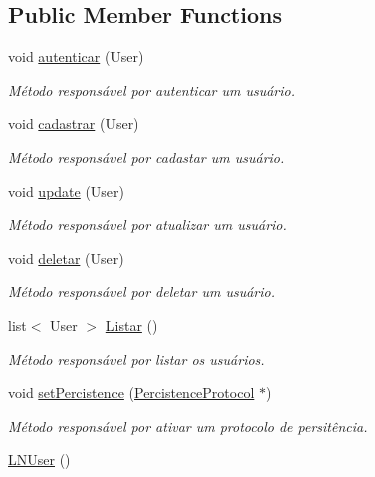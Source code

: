 \subsection*{Public Member Functions}
\begin{DoxyCompactItemize}
\item 
void \hyperlink{class_l_n_user_a74c91c7a9e6d8ceaf8ebfed027178221}{autenticar} (User)
\begin{DoxyCompactList}\small\item\em Método responsável por autenticar um usuário. \end{DoxyCompactList}\item 
void \hyperlink{class_l_n_user_a4702a50096c617aa7a9ea9b25fda3063}{cadastrar} (User)
\begin{DoxyCompactList}\small\item\em Método responsável por cadastar um usuário. \end{DoxyCompactList}\item 
void \hyperlink{class_l_n_user_a4093083f84eec431151c7315b5064b88}{update} (User)
\begin{DoxyCompactList}\small\item\em Método responsável por atualizar um usuário. \end{DoxyCompactList}\item 
void \hyperlink{class_l_n_user_ac2058724d8d0b2ab8da440b9acc2b80a}{deletar} (User)
\begin{DoxyCompactList}\small\item\em Método responsável por deletar um usuário. \end{DoxyCompactList}\item 
\hypertarget{class_l_n_user_a49a8cb98850d1812aa504fd7ec1c64f0}{list$<$ User $>$ \hyperlink{class_l_n_user_a49a8cb98850d1812aa504fd7ec1c64f0}{Listar} ()}\label{class_l_n_user_a49a8cb98850d1812aa504fd7ec1c64f0}

\begin{DoxyCompactList}\small\item\em Método responsável por listar os usuários. \end{DoxyCompactList}\item 
void \hyperlink{class_l_n_user_aadeddd422a7e5b1b7059b472dcee1631}{set\-Percistence} (\hyperlink{class_percistence_protocol}{Percistence\-Protocol} $\ast$)
\begin{DoxyCompactList}\small\item\em Método responsável por ativar um protocolo de persitência. \end{DoxyCompactList}\item 
\hypertarget{class_l_n_user_aacf199ac94fc28825e3692aa097fe842}{\hyperlink{class_l_n_user_aacf199ac94fc28825e3692aa097fe842}{L\-N\-User} ()}\label{class_l_n_user_aacf199ac94fc28825e3692aa097fe842}


\end{DoxyCompactItemize}
